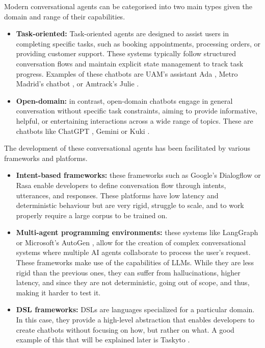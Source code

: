 Modern conversational agents can be categorised into two main types
given the domain and range of their capabilities.
\begin{itemize}
  \item \textbf{Task-oriented:}
    Task-oriented agents are designed to assist users in completing specific tasks,
    such as booking appointments, processing orders, or providing customer support.
    These systems typically follow structured conversation flows
    and maintain explicit state management to track task progress.
    Examples of these chatbots are
    UAM's assistant Ada \autocite{AdaUAM},
    Metro Madrid's chatbot \autocite{MetroMadridEmpleara2025},
    or Amtrack's Julie \autocite{MeetJulieYour}.

  \item \textbf{Open-domain:}
    in contrast, open-domain chatbots
    engage in general conversation without specific task constraints,
    aiming to provide informative, helpful, or entertaining interactions across a wide range of topics.
    These are chatbots like ChatGPT \autocite{ChatGPT},
    Gemini \autocite{GoogleGemini} or Kuki \autocite{Kuki_ai}.
\end{itemize}

The development of these conversational agents
has been facilitated by various frameworks and platforms.
\begin{itemize}
  \item \textbf{Intent-based frameworks:}
    these frameworks such as Google's Dialogflow \autocite{Dialogflow} or Rasa \autocite{Rasa2020}
    enable developers to define conversation flow through intents, utterances, and responses.
    These platforms have low latency and deterministic behaviour
    but are very rigid, struggle to scale,
    and to work properly require a large corpus to be trained on.

  \item \textbf{Multi-agent programming environments:}
    these systems like LangGraph \autocite{LangGraph} or Microsoft's AutoGen \autocite{AutoGen},
    allow for the creation of complex conversational systems
    where multiple \ac{AI} agents collaborate to process the user's request.
    These frameworks make use of the capabilities of \acp{LLM}.
    While they are less rigid than the previous ones,
    they can suffer from hallucinations,
    higher latency, and since they are not deterministic,
    going out of scope, and thus, making it harder to test it.

  \item \textbf{\ac{DSL} frameworks:}
    \acp{DSL} are languages specialized for a particular domain.
    In this case, they provide a high-level abstraction
    that enables developers to create chatbots
    without focusing on how, but rather on what.
    A good example of this that will be explained later is Taskyto
    \autocite{sanchezcuadradoAutomatingDevelopmentTaskoriented2024}.
\end{itemize}

